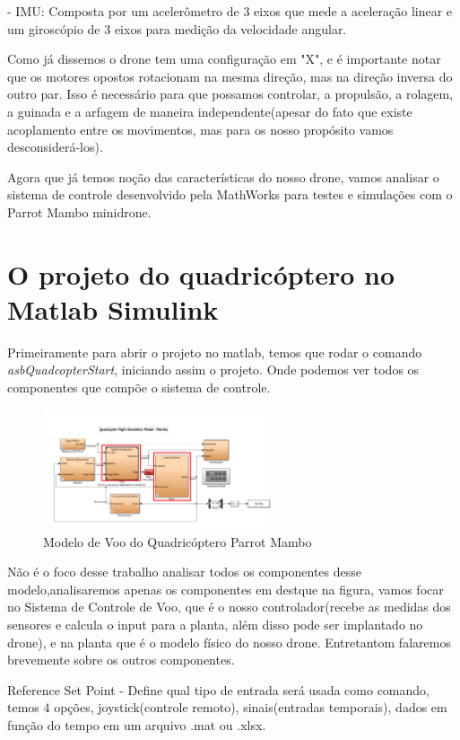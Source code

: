 - IMU: Composta por um acelerômetro de 3 eixos que mede a aceleração linear e um giroscópio de 3 eixos para medição da velocidade angular.

Como já dissemos o drone tem uma configuração em "X", e é importante notar que os motores opostos rotacionam na mesma direção, mas na direção inversa do outro par. Isso é necessário para que possamos controlar, a propulsão, a rolagem, a guinada e a arfagem de maneira independente(apesar do fato que existe acoplamento entre os movimentos, mas para os nosso propósito vamos desconsiderá-los).

Agora que já temos noção das características do nosso drone, vamos analisar o sistema de controle desenvolvido pela MathWorks para testes e simulações com o Parrot Mambo minidrone.

\section{O projeto do quadricóptero no Matlab Simulink}

Primeiramente para abrir o projeto no matlab, temos que rodar o comando \textit{asbQuadcopterStart}, iniciando assim o projeto. Onde podemos ver todos os componentes que compõe o sistema de controle. 

\begin{figure}[H]
	\centering
	\includegraphics[width=0.6\textwidth]{asbQuadcopterProject}
	\caption{Modelo de Voo do Quadricóptero Parrot Mambo}
	\centering
	\label{Modelo de Voo do Quadricóptero Parrot Mambo}
\end{figure}

Não é o foco desse trabalho analisar todos os componentes desse modelo,analisaremos apenas os componentes em destque na figura, vamos focar no Sistema de Controle de Voo, que é o nosso controlador(recebe as medidas dos sensores e calcula o input para a planta, além disso pode ser implantado no drone), e na planta que é o modelo físico do nosso drone. Entretantom falaremos brevemente sobre os outros componentes.

Reference Set Point - Define qual tipo de entrada será usada como comando, temos 4 opções, joystick(controle remoto), sinais(entradas temporais), dados em função do tempo em um arquivo .mat ou .xlsx.

